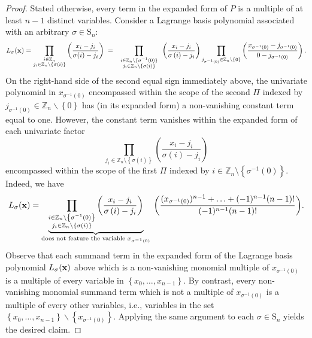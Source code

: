 \begin{proof}
  Stated otherwise, every term in the expanded form of $P$ is
a multiple of at least $n-1$ distinct variables. Consider a Lagrange
basis polynomial associated with an arbitrary $\sigma\in\text{S}_{n}$:
\[
L_{\sigma}({\bf x})=\prod_{\substack{i\in\mathbb{Z}_{n}\\
j_{i}\in\mathbb{Z}_{n}\setminus\{\sigma(i)\}
}
}\bigg(\frac{x_{i}-j_{i}}{\sigma(i)-j_{i}}\bigg)\;=\;\prod_{\begin{array}{c}
\substack{i\in\mathbb{Z}_{n}\setminus\{\sigma^{-1}(0)\}\\
j_{i}\in\mathbb{Z}_{n}\backslash\{\sigma(i)\}
}
\end{array}}\left(\frac{x_{i}-j_{i}}{\sigma\left(i\right)-j_{i}}\right)\prod_{j_{\sigma^{-1}\left(0\right)}\in\mathbb{Z}_{n}\backslash\left\{ 0\right\} }\left(\frac{x_{\sigma^{-1}\left(0\right)}-j_{\sigma^{-1}\left(0\right)}}{0-j_{\sigma^{-1}\left(0\right)}}\right).
\]
On the right-hand side of the second equal sign immediately above,
the univariate polynomial in $x_{\sigma^{-1}(0)}$ encompassed within the scope of the second $\Pi$
indexed by $j_{\sigma^{-1}\left(0\right)}\in\mathbb{Z}_{n}\backslash\left\{ 0\right\} $
has (in its expanded form) a non-vanishing constant term equal to
one. However, the constant term vanishes  within the expanded form
of each univariate factor
\[
\underset{j_{i}\in\mathbb{Z}_{n}\setminus\left\{ \sigma\left(i\right)\right\} }{\prod}\left(\frac{x_{i}-j_{i}}{\sigma\left(i\right)-j_{i}}\right)
\]
encompassed within the scope of the first $\Pi$ indexed by $i\in\mathbb{Z}_{n}\setminus\left\{ \sigma^{-1}\left(0\right)\right\}$. Indeed, we have
\[
L_{\sigma}({\bf x})=\underbrace{\prod_{\substack{i\in\mathbb{Z}_{n}\setminus\left\{ \sigma^{-1}\left(0\right)\right\} \\
j_{i}\in\mathbb{Z}_{n}\setminus\left\{ \sigma\left(i\right)\right\} 
}
}\bigg(\frac{x_{i}-j_{i}}{\sigma\left(i\right)-j_{i}}\bigg)}_{\text{does not feature the variable }x_{\sigma^{-1}\left(0\right)}}\:\bigg(\frac{(x_{\sigma^{-1}\left(0\right)})^{n-1}+\ldots+(-1)^{n-1}(n-1)!}{(-1)^{n-1}(n-1)!}\bigg).
\]
Observe that each summand term in the expanded form of the Lagrange
basis polynomial $L_{\sigma}({\bf x})$ above which is a non-vanishing
monomial multiple of $x_{\sigma^{-1}\left(0\right)}$ is a multiple
of every variable in $\left\{ x_{0},\ldots,x_{n-1}\right\} $. By
contrast, every non-vanishing monomial summand term which
is not a multiple of $x_{\sigma^{-1}\left(0\right)}$ is a multiple
of every other variables, i.e., variables in the set $\left\{ x_{0},\ldots,x_{n-1}\right\} \backslash\left\{ x_{\sigma^{-1}\left(0\right)}\right\} $.
Applying the same argument to each $\sigma\in\text{S}_{n}$ yields
the desired claim.
\end{proof}

